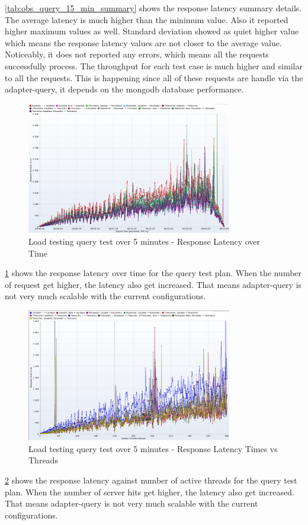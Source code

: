 \ref{tab:obs_query_15_min_summary} shows the response latency summary details. The average latency is much higher than the minimum value. Also it reported higher maximum values as well. Standard deviation showed as quiet higher value which means the response latency values are not closer to the average value. Noticeably, it does not reported any errors, which means all the requests successfully process.
The throughput for each test case is much higher and similar to all the requests. This is happening since all of these requests are handle via the adapter-query, it depends on the \acrshort{mongodb} database performance.

\begin{figure}[htp]
    \centering
    \includegraphics[width=0.8\textwidth]{results/obs/query/obs_query_5m_latency_over_time.png}
    \caption{Load testing query test over 5 minutes - Response Latency over Time}
    \label{fi:test_obs_query_5m_response_latency}
\end{figure}
\ref{fi:test_obs_query_5m_response_latency} shows the response latency over time for the query test plan. When the number of request get higher, the latency also get increased. That means adapter-query is not very much scalable with the current configurations.

\begin{figure}[htp]
    \centering
    \includegraphics[width=0.8\textwidth]{results/obs/query/obs_query_5m_response_times_vs_threads.png}
    \caption{Load testing query test over 5 minutes - Response Latency Times vs Threads}
    \label{fi:test_obs_query_5m_response_times_vs_threads}
\end{figure}
\ref{fi:test_obs_query_5m_response_times_vs_threads} shows the response latency against number of active threads for the query test plan. When the number of server hits get higher, the latency also get increased. That means adapter-query is not very much scalable with the current configurations.

